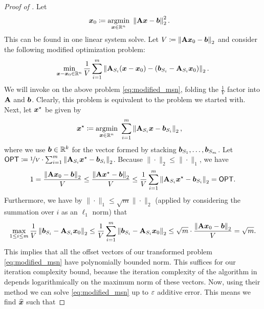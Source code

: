 \documentclass[11pt]{article}
\numberwithin{equation}{section}
\begin{document}
\begin{proof}[Proof of ]
Let
\begin{align*}
    \bm{x}_0 &\coloneqq \underset{\bm{x}\in\mathbb{R}^n}{\mathrm{argmin}}\  \left\lVert \mathbf{A}\bm{x}-\bm{b} \right\rVert_2^2.
\end{align*}
This can be found in one linear system solve. Let $V \coloneqq \left\lVert \mathbf{A}\bm{x}_0-\bm{b} \right\rVert_2$ and consider the following modified optimization problem:
\begin{align}
    \min_{\bm{x}-\bm{x}_0\in\mathbb{R}^n} \frac{1}{V}\sum_{i=1}^m \left\lVert \mathbf{A}_{S_i}(\bm{x}-\bm{x}_0)-(\bm{b}_{S_i}-\mathbf{A}_{S_i} \bm{x}_0) \right\rVert_2.\label{eq:modified_msn}
\end{align}
We will invoke \cite[Theorem 5.2]{xy97} on the above problem \eqref{eq:modified_msn}, folding the \(\frac{1}{V}\) factor into \(\mathbf{A}\) and \(\bm{b}\). Clearly, this problem is equivalent to the problem we started with. Next, let $\bm{x}^{\star}$ be given by
\begin{align*}
    \bm{x}^{\star} &\coloneqq \underset{\bm{x}\in\mathbb{R}^n}{\mathrm{argmin}}\  \sum_{i=1}^m \left\lVert \mathbf{A}_{S_i}\bm{x}-\bm{b}_{S_i} \right\rVert_2,
\end{align*}
where we use \(\bm{b} \in \mathbb{R}^k\) for the vector formed by stacking \(\bm{b}_{S_1}, \ldots, \bm{b}_{S_m}\).
Let $\mathsf{OPT} \coloneqq \nicefrac{1}{V} \cdot \sum_{i=1}^m \left\lVert \mathbf{A}_{S_i}\bm{x}^{\star}-\bm{b}_{S_i} \right\rVert_2$. 
Because \(\|\cdot\|_2 \le \|\cdot\|_1\), we have
\begin{align*}
    1=\frac{\left\lVert \mathbf{A}\bm{x}_0-\bm{b} \right\rVert_2}{V} \le \frac{\left\lVert \mathbf{A}\bm{x}^{\star}-\bm{b} \right\rVert_2}{V} \le \frac{1}{V}\sum_{i=1}^m \left\lVert \mathbf{A}_{S_i}\bm{x}^{\star}-\bm{b}_{S_i} \right\rVert_2 = \mathsf{OPT}.
\end{align*}
Furthermore, we have by \(\|\cdot\|_1 \le \sqrt{m}\|\cdot\|_2\) (applied by considering the summation over \(i\) as an \(\ell_1\) norm) that
\begin{align*}
    \max_{1 \le i \le m} \frac{1}{V}\left\lVert \bm{b}_{S_i}-\mathbf{A}_{S_i}\bm{x}_0 \right\rVert_2 \le \frac{1}{V}\sum_{i=1}^m \left\lVert \bm{b}_{S_i}-\mathbf{A}_{S_i}\bm{x}_0 \right\rVert_2 \le \sqrt{m} \cdot \frac{\left\lVert \mathbf{A}\bm{x}_0-\bm{b} \right\rVert_2}{V} = \sqrt{m}.
\end{align*}
This implies that all the offset vectors of our transformed problem \eqref{eq:modified_msn} have polynomially bounded norm. This suffices for our iteration complexity bound, because the iteration complexity of the algorithm in \cite{xy97} depends logarithmically on the maximum norm of these vectors. Now, using their method we can solve \eqref{eq:modified_msn} up to $\varepsilon$ additive error. This means we find $\widehat{\bm{x}}$ such that

\end{proof}
\end{document}
